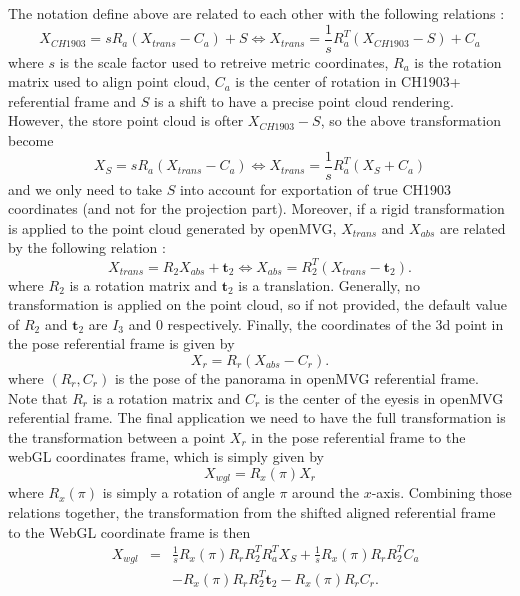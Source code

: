 \documentclass[a4paper, 11pt]{article}
\renewcommand{\t}{\mathbf{t}}
\begin{document}
   The notation define above are related to each other with the following relations :
   \begin{equation}
       X_{CH1903}  = s R_a ( X_{trans} - C_a ) + S \Leftrightarrow X_{trans} = \frac{1}{s} R_a^T ( X_{CH1903} -S ) + C_a
   \end{equation}
   where $s$ is the scale factor used to retreive metric coordinates, $R_a$ is the rotation matrix used to align
   point cloud, $C_a$ is the center of rotation in CH1903+ referential frame and $S$ is a shift to have a precise
   point cloud rendering. However, the store point cloud is ofter $X_{CH1903}-S$, so the above transformation become
   \begin{equation}
       X_{S}  = s R_a ( X_{trans} - C_a ) \Leftrightarrow X_{trans} = \frac{1}{s} R_a^T ( X_{S} + C_a )
   \end{equation}
   and we only need to take $S$ into account for exportation of true CH1903 coordinates (and not for the projection part).
   Moreover, if a rigid transformation is applied to the point cloud generated by openMVG, 
   $X_{trans}$ and $X_{abs}$ are related by the following relation :
   \begin{equation}
       X_{trans} = R_2 X_{abs} + \t_2 \Leftrightarrow X_{abs} = R_2^T (X_{trans} - \t_2).
   \end{equation}
   where $R_2$ is a rotation matrix and $\t_2$ is a translation. Generally, no transformation is applied on the point
   cloud, so if not provided, the default value of $R_2$ and $\t_2$ are $I_3$ and $0$ respectively. 
   Finally, the coordinates of the 3d point in the pose referential frame is given by
   \begin{equation}
       X_r = R_r (X_{abs}-C_r).
   \end{equation}
   where $(R_r, C_r)$ is the pose of the panorama in openMVG referential frame. 
   Note that $R_r$ is a rotation matrix and $C_r$ is the center of the eyesis in openMVG referential frame. 
   The final application we need to have the full transformation is the transformation between a point $X_r$ in the pose referential 
   frame to the webGL coordinates frame, which is simply given by
   \begin{equation}
       X_{wgl} = R_x(\pi) X_r
   \end{equation}
   where $R_x(\pi)$ is simply a rotation of angle $\pi$ around the $x$-axis. Combining those relations together, the transformation 
   from the shifted aligned referential frame to the WebGL coordinate frame is then 
   \begin{equation}
       \begin{aligned}
           & X_{wgl} & = & \frac{1}{s} R_x(\pi) R_r R_2^T R_a^T X_S + \frac{1}{s} R_x(\pi) R_r R_2^T C_a \\
            &&&       -R_x(\pi) R_r R_2^T \t_2 - R_x(\pi) R_r C_r.
       \end{aligned}
   \end{equation} 
\end{document}
